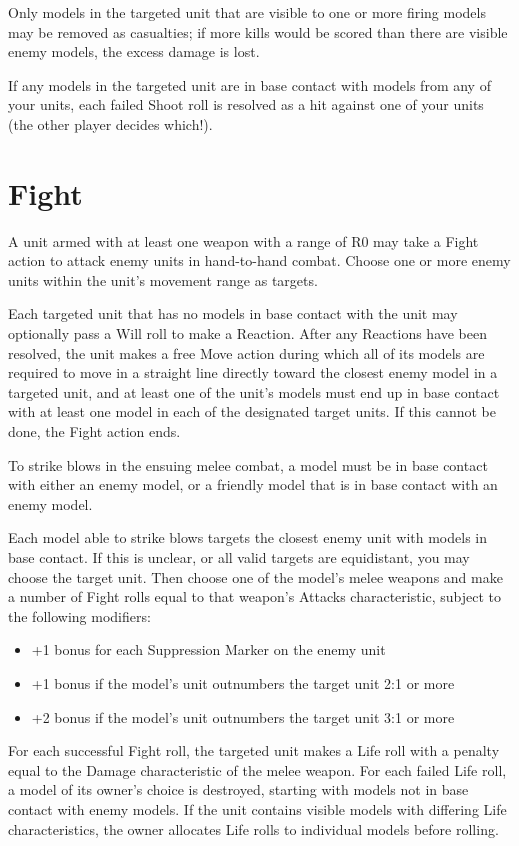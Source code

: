 \begin{multicols}{2}
Only models in the targeted unit that are visible to one or more firing models may be removed as casualties; if more kills would be scored than there are visible enemy models, the excess damage is lost.

If any models in the targeted unit are in base contact with models from any of your units, each failed Shoot roll is resolved as a hit against one of your units (the other player decides which!).




\section*{Fight}
A unit armed with at least one weapon with a range of R0 may take a Fight action to attack enemy units in hand-to-hand combat. Choose one or more enemy units within the unit's movement range as targets.

Each targeted unit that has no models in base contact with the unit may optionally pass a Will roll to make a Reaction. After any Reactions have been resolved, the unit makes a free Move action during which all of its models are required to move in a straight line directly toward the closest enemy model in a targeted unit, and at least one of the unit's models must end up in base contact with at least one model in each of the designated target units. If this cannot be done, the Fight action ends.

To strike blows in the ensuing melee combat, a model must be in base contact with either an enemy model, or a friendly model that is in base contact with an enemy model.

Each model able to strike blows targets the closest enemy unit with models in base contact. If this is unclear, or all valid targets are equidistant, you may choose the target unit. Then choose one of the model's melee weapons and make a number of Fight rolls equal to that weapon's Attacks characteristic, subject to the following modifiers:

\begin{itemize}
 \item +1 bonus for each Suppression Marker on the enemy unit
 \item +1 bonus if the model's unit outnumbers the target unit 2:1 or more
 \item +2 bonus if the model's unit outnumbers the target unit 3:1 or more
\end{itemize}

For each successful Fight roll, the targeted unit makes a Life roll with a penalty equal to the Damage characteristic of the melee weapon. For each failed Life roll, a model of its owner's choice is destroyed, starting with models not in base contact with enemy models. If the unit contains visible models with differing Life characteristics, the owner allocates Life rolls to individual models before rolling.





\end{multicols}
